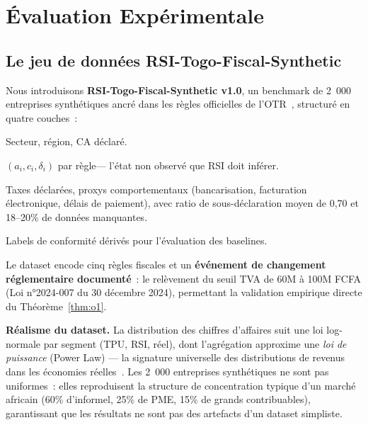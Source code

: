 \documentclass[letterpaper]{article}
\begin{document}
\section{\'Evaluation Exp\'erimentale}
\label{sec:experiments}

\subsection{Le jeu de donn\'ees RSI-Togo-Fiscal-Synthetic}

Nous introduisons \textbf{RSI-Togo-Fiscal-Synthetic v1.0}, un benchmark
de 2~000 entreprises synth\'etiques ancr\'e dans les r\`egles officielles
de l'OTR~\citep{otr2024lf}, structur\'e en quatre couches~:

\begin{description}[leftmargin=1.5em]
  \item[Caract\'eristiques des entreprises] Secteur, r\'egion, CA d\'eclar\'e.
  \item[V\'erit\'e terrain latente] $(a_i, c_i, \delta_i)$ par r\`egle---
        l'\'etat non observ\'e que RSI doit inf\'erer.
  \item[Observations bruit\'ees] Taxes d\'eclar\'ees, proxys comportementaux
        (bancarisation, facturation \'electronique, d\'elais de paiement),
        avec ratio de sous-d\'eclaration moyen de 0,70 et 18--20\%
        de donn\'ees manquantes.
  \item[\'Etiquettes binaires] Labels de conformit\'e d\'eriv\'es pour
        l'\'evaluation des baselines.
\end{description}

\noindent Le dataset encode cinq r\`egles fiscales et un
\textbf{\'ev\'enement de changement r\'eglementaire document\'e}~:
le rel\`evement du seuil TVA de 60M \`a 100M FCFA (Loi n°2024-007
du 30 d\'ecembre 2024), permettant la validation empirique directe
du Th\'eor\`eme~\ref{thm:o1}.

\noindent\textbf{R\'ealisme du dataset.} La distribution des chiffres
d'affaires suit une loi log-normale par segment (TPU, RSI, r\'eel),
dont l'agr\'egation approxime une \emph{loi de puissance} (Power Law)
--- la signature universelle des distributions de revenus dans les
\'economies r\'eelles~\citep{gabaix2009power}. Les 2~000 entreprises
synth\'etiques ne sont pas uniformes~: elles reproduisent la structure
de concentration typique d'un march\'e africain (60\% d'informel,
25\% de PME, 15\% de grands contribuables), garantissant que les
r\'esultats ne sont pas des artefacts d'un dataset simpliste.
\end{document}
